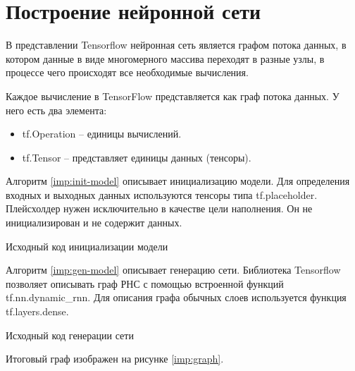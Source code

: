 \section{Построение нейронной сети}

В представлении Tensorflow нейронная сеть является графом потока данных, в котором данные в виде многомерного массива переходят в разные узлы, в процессе чего происходят все необходимые вычисления.

Каждое вычисление в TensorFlow представляется как граф потока данных. У него есть два элемента:

\begin{itemize}
	\item tf.Operation -- единицы вычислений.
	\item tf.Tensor -- представляет единицы данных (тенсоры).
\end{itemize}

Алгоритм \ref{imp:init-model} описывает инициализацию модели. Для определения входных и выходных данных используются тенсоры типа tf.placeholder. Плейсхолдер нужен исключительно в качестве цели наполнения. Он не инициализирован и не содержит данных.

\begin{minipage}{0.8\textwidth}
\begin{algorithm}[H]

\caption{Исходный код инициализации модели}
\label{imp:init-model}
\end{algorithm}
\end{minipage}

Алгоритм \ref{imp:gen-model} описывает генерацию сети. Библиотека Tensorflow позволяет описывать граф РНС с помощью встроенной функций tf.nn.dynamic\_rnn. Для описания графа обычных слоев используется функция tf.layers.dense.

\begin{minipage}{0.8\textwidth}
\begin{algorithm}[H]
	
	\caption{Исходный код генерации сети}
	\label{imp:gen-model}
\end{algorithm}
\end{minipage}

Итоговый граф изображен на рисунке \ref{imp:graph}.

